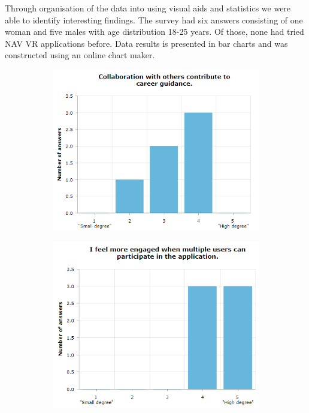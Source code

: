 Through organisation of the data into using visual aids and statistics we were able to identify interesting findings. The survey had six answers consisting of one woman and five males with age distribution 18-25 years. Of those, none had tried NAV VR applications before. Data results is presented in bar charts and was constructed using an online chart maker. 


\begin{figure}[]
  \begin{subfigure}[b]{0.5\textwidth}
    \captionsetup{width=0.8\linewidth}
    \includegraphics[width=1\textwidth]{fig/phase_2/charts/collabIncreaseCareer.PNG}
    \caption{}
    \label{fig:phase2_collabIncreaseCareer}
  \end{subfigure}
  \hfill%
  \begin{subfigure}[b]{0.5\textwidth}
    \captionsetup{width=0.8\linewidth}
    \includegraphics[width=1\textwidth]{fig/phase_2/charts/collabMoreEngaged.PNG}

\end{subfigure}
\end{figure}
